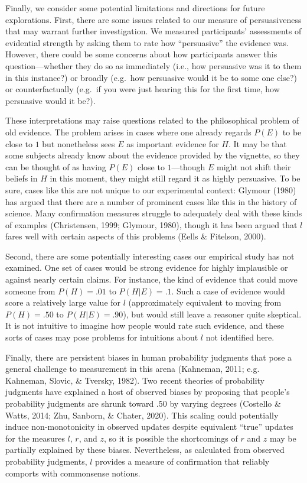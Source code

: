 \documentclass[10pt, letterpaper]{article}
\begin{document}
Finally, we consider some potential limitations and directions for
future explorations. First, there are some issues related to our measure
of persuasiveness that may warrant further investigation. We measured
participants' assessments of evidential strength by asking them to rate
how ``persuasive'' the evidence was. However, there could be some
concerns about how participants answer this question---whether they do
so as immediately (i.e., how persuasive was it to them in this
instance?) or broadly (e.g.~how persuasive would it be to some one
else?) or counterfactually (e.g.~if you were just hearing this for the
first time, how persuasive would it be?).

These interpretations may raise questions related to the philosophical
problem of old evidence. The problem arises in cases where one already
regards \(P(E)\) to be close to \(1\) but nonetheless sees \(E\) as
important evidence for \(H\). It may be that some subjects already know
about the evidence provided by the vignette, so they can be thought of
as having \(P(E)\) close to \(1\)---though \(E\) might not shift their
beliefs in \(H\) in this moment, they might still regard it as highly
persuasive. To be sure, cases like this are not unique to our
experimental context: Glymour (1980) has argued that there are a number
of prominent cases like this in the history of science. Many
confirmation measures struggle to adequately deal with these kinds of
examples (Christensen, 1999; Glymour, 1980), though it has been argued
that \(l\) fares well with certain aspects of this problems (Eells \&
Fitelson, 2000).

Second, there are some potentially interesting cases our empirical study
has not examined. One set of cases would be strong evidence for highly
implausible or against nearly certain claims. For instance, the kind of
evidence that could move someone from \(P(H) = .01\) to \(P(H|E) = .1\).
Such a case of evidence would score a relatively large value for \(l\)
(approximately equivalent to moving from \(P(H) = .50\) to
\(P(H|E) = .90\)), but would still leave a reasoner quite skeptical. It
is not intuitive to imagine how people would rate such evidence, and
these sorts of cases may pose problems for intuitions about \(l\) not
identified here.

Finally, there are persistent biases in human probability judgments that
pose a general challenge to measurement in this arena (Kahneman, 2011;
e.g. Kahneman, Slovic, \& Tversky, 1982). Two recent theories of
probability judgments have explained a host of observed biases by
proposing that people's probability judgments are shrunk toward .50 by
varying degrees (Costello \& Watts, 2014; Zhu, Sanborn, \& Chater,
2020). This scaling could potentially induce non-monotonicity in
observed updates despite equivalent ``true'' updates for the measures
\(l\), \(r\), and \(z\), so it is possible the shortcomings of \(r\) and
\(z\) may be partially explained by these biases. Nevertheless, as
calculated from observed probability judgments, \(l\) provides a measure
of confirmation that reliably comports with commonsense notions.
\end{document}
